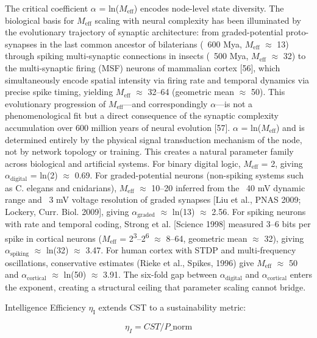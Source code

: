 \documentclass[a4paper,12pt]{article}
\begin{document}
The critical coefficient $\alpha$ = ln($M_{\text{eff}}$) encodes node-level state diversity.
The biological basis for $M_{\text{eff}}$ scaling with neural complexity has been illuminated by the evolutionary trajectory of synaptic architecture: from graded-potential proto-synapses in the last common ancestor of bilaterians (~600 Mya, $M_{\text{eff}}$ $\approx$ 13) through spiking multi-synaptic connections in insects (~500 Mya, $M_{\text{eff}}$ $\approx$ 32) to the multi-synaptic firing
(MSF) neurons of mammalian cortex [56], which simultaneously encode spatial intensity via firing rate and temporal dynamics via precise spike timing, yielding $M_{\text{eff}}$ $\approx$ 32--64 (geometric mean $\approx$ 50).
This evolutionary progression of $M_{\text{eff}}$---and correspondingly $\alpha$---is not a phenomenological fit but a direct consequence of the synaptic complexity accumulation over 600 million years of neural evolution [57]. $\alpha$ = ln($M_{\text{eff}}$) and is determined entirely by the physical signal transduction mechanism of the node, not by network topology or training.
This creates a natural parameter family across biological and artificial systems.
For binary digital logic, $M_{\text{eff}}$ = 2, giving $\alpha_{\text{digital}}$ = ln(2) $\approx$ 0.69.
For graded-potential neurons (non-spiking systems such as C. elegans and cnidarians), $M_{\text{eff}}$ $\approx$ 10--20 inferred from the ~40 mV dynamic range and ~3 mV voltage resolution of graded synapses [Liu et al., PNAS 2009; Lockery, Curr.
Biol. 2009], giving $\alpha_{\text{graded}}$ $\approx$ ln(13) $\approx$ 2.56.
For spiking neurons with rate and temporal coding, Strong et al. [Science 1998] measured 3--6 bits per spike in cortical neurons ($M_{\text{eff}}$ = 2\textsuperscript{3}--2\textsuperscript{6} $\approx$ 8--64, geometric mean $\approx$ 32), giving $\alpha_{\text{spiking}}$ $\approx$ ln(32) $\approx$ 3.47.
For human cortex with STDP and multi-frequency oscillations, conservative estimates (Rieke et al., Spikes, 1996) give $M_{\text{eff}}$ $\approx$ 50 and $\alpha_{\text{cortical}}$ $\approx$ ln(50) $\approx$ 3.91.
The six-fold gap between $\alpha_{\text{digital}}$ and $\alpha_{\text{cortical}}$ enters the exponent, creating a structural ceiling that parameter scaling cannot bridge.


Intelligence Efficiency $\eta_{\text{I}}$ extends CST to a sustainability metric:


\begin{equation}
\eta_I = CST / P\_{\text{norm}} \tag{5}
\end{equation}
\end{document}

